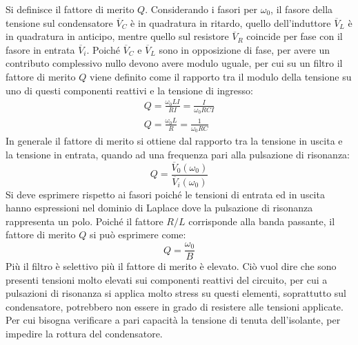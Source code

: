 \documentclass{article}
\numberwithin{equation}{subsection}
\begin{document}
Si definisce il fattore di merito $Q$. 
Considerando i fasori per $\omega_0$, il fasore della tensione sul condensatore $\overline{V}_C$ è in quadratura in ritardo, quello dell'induttore $\overline{V}_L$ è in 
quadratura in anticipo, mentre quello sul resistore $\overline{V}_R$ coincide per fase con il fasore in entrata $\overline{V}_i$. 
Poiché $\overline{V}_C$ e $\overline{V}_L$ sono in opposizione di fase, per avere un contributo complessivo nullo devono avere modulo uguale, per cui su un filtro il 
fattore di merito $Q$ viene definito come il rapporto tra il modulo della tensione su uno di questi componenti reattivi e la tensione di ingresso:
\begin{gather*}
    Q=\displaystyle\frac{\omega_0LI}{RI}=\frac{I}{\omega_0RCI}\\
    Q=\displaystyle\frac{\omega_0L}{R}=\frac{1}{\omega_0RC}
\end{gather*}
In generale il fattore di merito si ottiene dal rapporto tra la tensione in uscita e la tensione in entrata, quando ad una frequenza pari alla pulsazione di risonanza:
\begin{equation}
    Q=\displaystyle\frac{\overline V_0(\omega_0)}{\overline V_{i}(\omega_0)}
\end{equation}
Si deve esprimere rispetto ai fasori poiché le tensioni di entrata ed in uscita hanno espressioni nel dominio di Laplace dove la pulsazione di risonanza rappresenta un polo. 
Poiché il fattore $R/L$ corrisponde alla banda passante, il fattore di merito $Q$ si può esprimere come:
\begin{equation}
    Q=\displaystyle\frac{\omega_0}{B}
\end{equation}
Più il filtro è selettivo più il fattore di merito è elevato. Ciò vuol dire che sono presenti tensioni molto elevati sui componenti reattivi del circuito, per cui 
a pulsazioni di risonanza si applica molto stress su questi elementi, soprattutto sul condensatore, potrebbero non essere in grado di resistere alle tensioni applicate. 
Per cui bisogna verificare a pari capacità la tensione di tenuta dell'isolante, per impedire la rottura del condensatore. 
\end{document}
